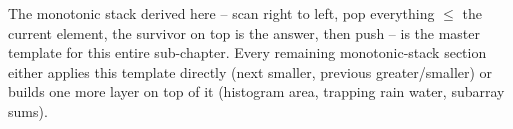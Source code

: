 \begin{takeawaybox}
The monotonic stack derived here -- scan right to left, pop everything
$\le$ the current element, the survivor on top is the answer, then push
-- is the master template for this entire sub-chapter. Every remaining
monotonic-stack section either applies this template directly (next
smaller, previous greater/smaller) or builds one more layer on top of it
(histogram area, trapping rain water, subarray sums).
\end{takeawaybox}
